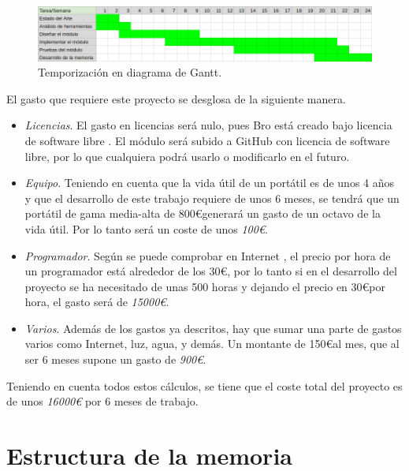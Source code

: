 \begin{figure}[H]
  \includegraphics[width=1\textwidth]{imagenes/temporizacion.png} 
  \centering
  \caption{Temporización en diagrama de Gantt.}\label{fig.tempo}
\end{figure}

El gasto que requiere este proyecto se desglosa de la siguiente manera.
\begin{itemize}
\item \textit{Licencias}. El gasto en licencias será nulo, pues Bro está creado bajo licencia de software libre \cite{broindex}. El 
módulo será subido a GitHub \cite{repo} con licencia de software libre, por lo que cualquiera podrá usarlo o modificarlo en el futuro.
\item \textit{Equipo}. Teniendo en cuenta que la vida útil de un portátil es de unos 4 años y que el desarrollo de este trabajo 
requiere de unos 6 meses, se tendrá que un portátil de gama media-alta de 800\euro generará un gasto de un octavo de la vida útil. Por 
lo tanto será un coste de unos \textit{100\euro}.
\item \textit{Programador}. Según se puede comprobar en Internet \cite{tarifa}, el precio por hora de un programador está alrededor de  
los 30\euro, por lo tanto si en el desarrollo del proyecto se ha necesitado de unas 500 horas y dejando el precio en 30\euro por hora, 
el gasto será de \textit{15000\euro}.
\item \textit{Varios}. Además de los gastos ya descritos, hay que sumar una parte de gastos varios como Internet, luz, agua, y 
demás. Un montante de 150\euro al mes, que al ser 6 meses supone un gasto de \textit{900\euro}.
\end{itemize}

\intro Teniendo en cuenta todos estos cálculos, se tiene que el coste total del proyecto es de unos \textit{16000\euro} por 6 meses de 
trabajo.

\section{Estructura de la memoria}

